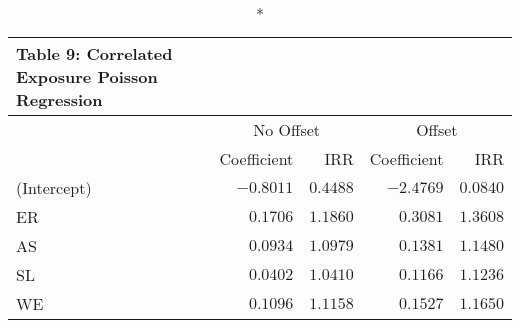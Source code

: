 \begin{longtable}{l|rrrr}
\caption*{
{\large Table 9: Correlated Exposure Poisson Regression}
} \\ 
\toprule
\multicolumn{1}{l}{} & \multicolumn{2}{c}{No Offset} & \multicolumn{2}{c}{Offset} \\ 
\cmidrule(lr){2-3} \cmidrule(lr){4-5}
\multicolumn{1}{l}{} & Coefficient & IRR & Coefficient & IRR \\ 
\midrule
(Intercept) & $-0.8011$ & $0.4488$ & $-2.4769$ & $0.0840$ \\ 
ER & $0.1706$ & $1.1860$ & $0.3081$ & $1.3608$ \\ 
AS & $0.0934$ & $1.0979$ & $0.1381$ & $1.1480$ \\ 
SL & $0.0402$ & $1.0410$ & $0.1166$ & $1.1236$ \\ 
WE & $0.1096$ & $1.1158$ & $0.1527$ & $1.1650$ \\ 
\bottomrule
\end{longtable}

